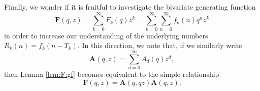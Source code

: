 \documentclass[11pt]{article}
\theoremstyle{plain}
\theoremstyle{definition}
\begin{document}
Finally, we wonder if it is fruitful to investigate the bivariate generating
function
\begin{equation*}
  \boldsymbol{F} (q, z) = \sum_{k = 0}^{\infty} F_k (q) z^k = \sum_{k =
   0}^{\infty} \sum_{n = 0}^{\infty} f_k (n) q^n z^k
\end{equation*}
in order to increase our understanding of the underlying numbers $R_k (n) =
f_k (n - T_k)$. In this direction, we note that, if we similarly write
\begin{equation*}
  \boldsymbol{A} (q, z) = \sum_{d = 0}^{\infty} A_d (q) z^d,
\end{equation*}
then Lemma \ref{lem:F:gf} becomes equivalent to the simple relationship
\begin{equation*}
  \boldsymbol{F} (q, z) =\boldsymbol{A} (q, q z) \boldsymbol{A} (q, z) .
\end{equation*}
\end{document}
